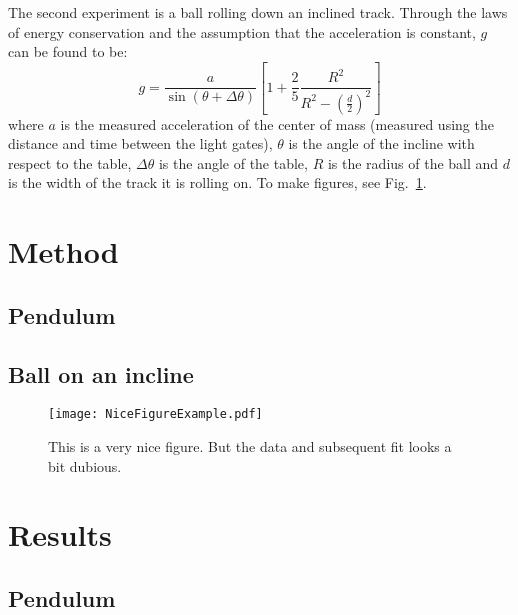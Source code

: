 \documentclass[a4paper,%
               aps,%
               prl,%
               amsfonts,%
               amssymb,%
               amsmath,%
               nobibnotes,%
               twocolumn, %
               twoside,%
               balancelastpage,%
               eqsecnum] %
               {revtex4-1}
\begin{document}
The second experiment is a ball rolling down an inclined track. Through the laws of energy conservation and the assumption that the
acceleration is constant, $g$ can be found to be:
\begin{equation}
g = \frac{a}{\sin(\theta + \Delta\theta)}\left[1+\frac{2}{5}\frac{R^2}{R^2 - \left(\frac{d}{2}\right)^2}\right] \label{eq:Ball}
\end{equation}
where $a$ is the measured acceleration of the center of mass (measured using the distance and time between the light gates), $\theta$ is the angle of the incline with respect to the table, $\Delta \theta$ is the angle of the table, $R$ is the radius of the ball and $d$ is the width of the track it is rolling on. To make figures, see Fig.\ \ref{fig:fit}.


\section{Method}
\subsection{Pendulum}
\lipsum[1-3]

\subsection{Ball on an incline}
\lipsum[1-3]

\begin{figure}[h]
\centering
\texttt{[image: NiceFigureExample.pdf]}
\caption{This is a very nice figure. But the data and subsequent fit looks a bit dubious. \label{fig:fit}}
\end{figure}


\section{Results}
\subsection{Pendulum}
\end{document}
